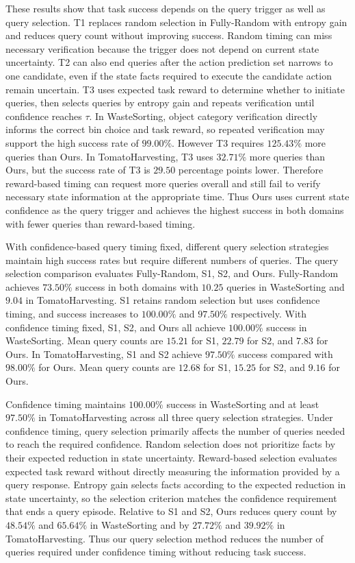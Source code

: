 These results show that task success depends on the query trigger as well as query selection. T1 replaces random selection in Fully-Random with entropy gain and reduces query count without improving success. Random timing can miss necessary verification because the trigger does not depend on current state uncertainty. T2 can also end queries after the action prediction set narrows to one candidate, even if the state facts required to execute the candidate action remain uncertain. T3 uses expected task reward to determine whether to initiate queries, then selects queries by entropy gain and repeats verification until confidence reaches $\tau$. In WasteSorting, object category verification directly informs the correct bin choice and task reward, so repeated verification may support the high success rate of $99.00\%$. However T3 requires $125.43\%$ more queries than Ours. In TomatoHarvesting, T3 uses $32.71\%$ more queries than Ours, but the success rate of T3 is $29.50$ percentage points lower. Therefore reward-based timing can request more queries overall and still fail to verify necessary state information at the appropriate time. Thus Ours uses current state confidence as the query trigger and achieves the highest success in both domains with fewer queries than reward-based timing.

With confidence-based query timing fixed, different query selection strategies maintain high success rates but require different numbers of queries. The query selection comparison evaluates Fully-Random, S1, S2, and Ours. Fully-Random achieves $73.50\%$ success in both domains with $10.25$ queries in WasteSorting and $9.04$ in TomatoHarvesting. S1 retains random selection but uses confidence timing, and success increases to $100.00\%$ and $97.50\%$ respectively. With confidence timing fixed, S1, S2, and Ours all achieve $100.00\%$ success in WasteSorting. Mean query counts are $15.21$ for S1, $22.79$ for S2, and $7.83$ for Ours. In TomatoHarvesting, S1 and S2 achieve $97.50\%$ success compared with $98.00\%$ for Ours. Mean query counts are $12.68$ for S1, $15.25$ for S2, and $9.16$ for Ours.

Confidence timing maintains $100.00\%$ success in WasteSorting and at least $97.50\%$ in TomatoHarvesting across all three query selection strategies. Under confidence timing, query selection primarily affects the number of queries needed to reach the required confidence. Random selection does not prioritize facts by their expected reduction in state uncertainty. Reward-based selection evaluates expected task reward without directly measuring the information provided by a query response. Entropy gain selects facts according to the expected reduction in state uncertainty, so the selection criterion matches the confidence requirement that ends a query episode. Relative to S1 and S2, Ours reduces query count by $48.54\%$ and $65.64\%$ in WasteSorting and by $27.72\%$ and $39.92\%$ in TomatoHarvesting. Thus our query selection method reduces the number of queries required under confidence timing without reducing task success.

